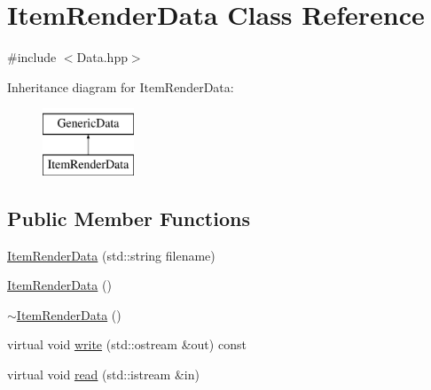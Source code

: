\hypertarget{class_item_render_data}{\section{Item\-Render\-Data Class Reference}
\label{class_item_render_data}
}


{\ttfamily \#include $<$Data.\-hpp$>$}

Inheritance diagram for Item\-Render\-Data\-:\begin{figure}[H]
\begin{center}
\leavevmode
\includegraphics[height=2.000000cm]{class_item_render_data}
\end{center}
\end{figure}
\subsection*{Public Member Functions}
\begin{DoxyCompactItemize}
\item 
\hyperlink{class_item_render_data_a0723c1d09d574fbff96266c59ad7f480}{Item\-Render\-Data} (std\-::string filename)
\item 
\hyperlink{class_item_render_data_a195a4e545e323c4d32fc02a6eeec0a8c}{Item\-Render\-Data} ()
\item 
\hyperlink{class_item_render_data_a0242f6a6149a9e3945b8a2fd7faa2575}{$\sim$\-Item\-Render\-Data} ()
\item 
virtual void \hyperlink{class_item_render_data_a13f92fc9e5386ef04fb736fbacc17a7e}{write} (std\-::ostream \&out) const 
\item 
virtual void \hyperlink{class_item_render_data_afbda96d49108440c6ce4a9c0b541116f}{read} (std\-::istream \&in)
\end{DoxyCompactItemize}
